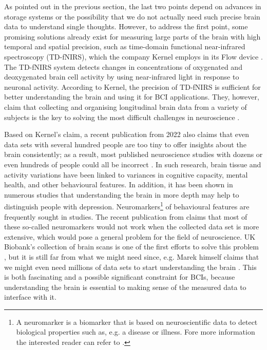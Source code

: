 As pointed out in the previous section, the last two points depend on advances in storage systems or the possibility that we do not actually need such precise brain data to understand single thoughts. However, to address the first point, some promising solutions already exist for measuring large parts of the brain with high temporal and spatial precision, such as time-domain functional near-infrared spectroscopy (TD-fNIRS), which the company Kernel employs in its Flow device \citep{ban_kernel_2021}. The TD-fNIRS system detects changes in concentrations of oxygenated and deoxygenated brain cell activity by using near-infrared light in response to neuronal activity. According to Kernel, the precision of TD-fNIRS is sufficient for better understanding the brain and using it for BCI applications. They, however, claim that collecting and organising longitudinal brain data from a variety of subjects is the key to solving the most difficult challenges in neuroscience \citep{kernel_hello-humanitypdf_nodate}.

\newpage

Based on Kernel's claim, a recent publication from 2022 also claims that even data sets with several hundred people are too tiny to offer insights about the brain consistently; as a result, most published neuroscience studies with dozens or even hundreds of people could all be incorrect \citep{marek_reproducible_2022}. In such research, brain tissue and activity variations have been linked to variances in cognitive capacity, mental health, and other behavioural features. In addition, it has been shown in numerous studies that understanding the brain in more depth may help to distinguish people with depression. Neuromarkers\footnote{A neuromarker is a biomarker that is based on neuroscientific data to detect biological properties such as, e.g. a disease or illness. Fore more information the interested reader can refer to \cite{jollans_neuromarkers_2018}.} of behavioural features are frequently sought in studies. The recent publication from \citeauthor{marek_reproducible_2022} claims that most of these so-called neuromarkers would not work when the collected data set is more extensive, which would pose a general problem for the field of neuroscience. UK Biobank's collection of brain scans is one of the first efforts to solve this problem \citep{noauthor_imaging_nodate}, but it is still far from what we might need since, e.g. Marek himself claims that we might even need millions of data sets to start understanding the brain \citep{callaway_can_2022}. This is both fascinating and a possible significant constraint for BCIs, because understanding the brain is essential to making sense of the measured data to interface with it.

